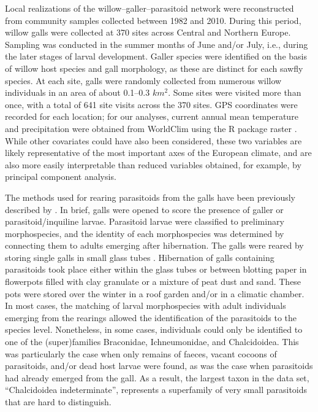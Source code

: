 \documentclass[12pt]{article}
\begin{document}
Local realizations of the willow–galler–parasitoid network were reconstructed
from community samples collected between 1982 and 2010. During this period,
willow galls were collected at 370 sites across Central and Northern Europe.
Sampling was conducted in the summer months of June and/or July, i.e., during
the later stages of larval development. Galler species were identified on the
basis of willow host species and gall morphology, as these are distinct for
each sawfly species. At each site, galls were randomly collected from numerous
willow individuals in an area of about 0.1–0.3 $km^2$. Some sites were visited
more than once, with a total of 641 site visits across the 370 sites. GPS
coordinates were recorded for each location; for our analyses, current
annual mean temperature and precipitation were obtained from WorldClim using
the R package raster \citep{Hijmans2015}. While other covariates could have
also been considered, these two variables are likely representative of the most
important axes of the European climate, and are also more easily interpretable than
reduced variables obtained, for example, by principal component analysis.

The methods used for rearing parasitoids from the galls have been
previously described by \citealt{Kopelke2003}. In brief, galls were
opened to score the presence of galler or parasitoid/inquiline larvae. Parasitoid
larvae were classified to preliminary morphospecies, and the identity of each
morphospecies was determined by connecting them to adults emerging after
hibernation. The galls were reared by storing single galls in small glass
tubes \citep{Kopelke1985a}. Hibernation of galls containing parasitoids took place
either within the glass tubes or between blotting paper in flowerpots filled
with clay granulate or a mixture of peat dust and sand. These pots were stored
over the winter in a roof garden and/or in a climatic chamber. In most cases,
the matching of larval morphospecies with adult individuals emerging from the
rearings allowed the identification of the parasitoids to the species
level. Nonetheless, in some cases, individuals could only be identified to one
of the (super)families Braconidae, Ichneumonidae, and Chalcidoidea. This was
particularly the case when only remains of faeces, vacant cocoons of
parasitoids, and/or dead host larvae were found, as was the case when
parasitoids had already emerged from the gall. As a result, the largest taxon
in the data set, ``Chalcidoidea indeterminate'', represents a superfamily of
very small parasitoids that are hard to distinguish.
\end{document}
